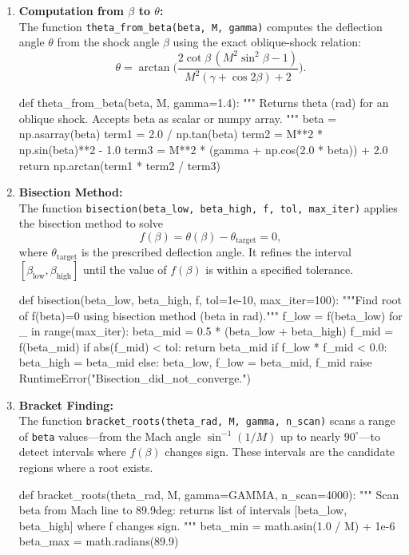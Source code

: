 \begin{enumerate}[label=- , leftmargin=*, itemsep=1em]
    \item \textbf{Computation from \(\beta\) to \(\theta\):} \\
    The function \texttt{theta\_from\_beta(beta, M, gamma)} computes the deflection angle \(\theta\) from the shock angle \(\beta\) using the exact oblique-shock relation:
    \[
    \theta = \arctan\!\Biggl( \frac{2\cot\beta\, (M^2\sin^2\beta - 1)}{M^2\left(\gamma + \cos2\beta\right)+2} \Biggr).
    \]
	\begin{pycode}
def theta_from_beta(beta, M, gamma=1.4):
	"""
	Returns theta (rad) for an oblique shock.
	Accepts beta as scalar or numpy array.
	"""
	beta = np.asarray(beta)
	term1 = 2.0 / np.tan(beta)
	term2 = M**2 * np.sin(beta)**2 - 1.0
	term3 = M**2 * (gamma + np.cos(2.0 * beta)) + 2.0
	return np.arctan(term1 * term2 / term3) 
	\end{pycode}


    \item \textbf{Bisection Method:} \\
    The function \texttt{bisection(beta\_low, beta\_high, f, tol, max\_iter)} applies the bisection method to solve 
    \[
    f(\beta) = \theta(\beta) - \theta_{\text{target}} = 0,
    \]
    where \(\theta_{\text{target}}\) is the prescribed deflection angle. It refines the interval \([\beta_{\text{low}}, \beta_{\text{high}}]\) until the value of \(f(\beta)\) is within a specified tolerance.
	\begin{pycode}
def bisection(beta_low, beta_high, f, tol=1e-10, max_iter=100):
	"""Find root of f(beta)=0 using bisection method (beta in rad)."""
	f_low = f(beta_low)
	for _ in range(max_iter):
		beta_mid = 0.5 * (beta_low + beta_high)
		f_mid = f(beta_mid)
		if abs(f_mid) < tol:
			return beta_mid
		if f_low * f_mid < 0.0:
			beta_high = beta_mid
		else:
			beta_low, f_low = beta_mid, f_mid
	raise RuntimeError("Bisection_did_not_converge.")	
	\end{pycode}


	\item \textbf{Bracket Finding:} \\
	The function \texttt{bracket\_roots(theta\_rad, M, gamma, n\_scan)} scans a range of \texttt{beta} values—from the Mach angle \(\sin^{-1}(1/M)\) up to nearly \(90^\circ\)—to detect intervals where \(f(\beta)\) changes sign. These intervals are the candidate regions where a root exists.
	\begin{pycode}
def bracket_roots(theta_rad, M, gamma=GAMMA, n_scan=4000):
	"""
	Scan beta from Mach line to 89.9deg:
	returns list of intervals [beta_low, beta_high] where f changes sign.
	"""
	beta_min = math.asin(1.0 / M) + 1e-6
	beta_max = math.radians(89.9)


\end{pycode}
\end{enumerate}

